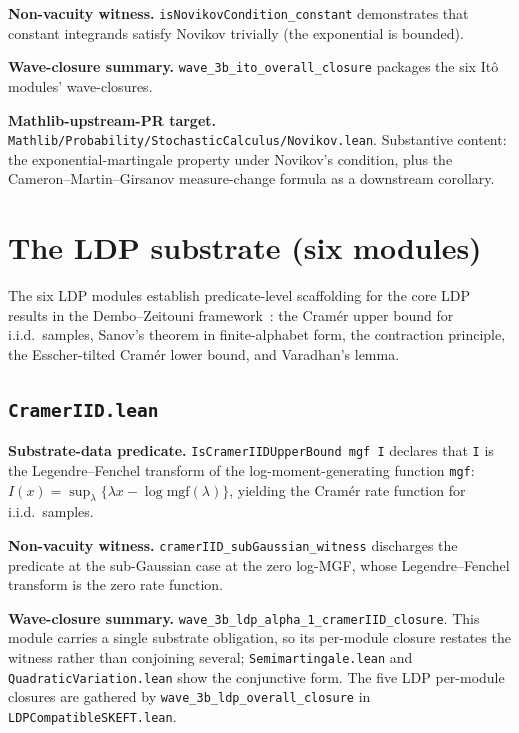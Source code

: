 \documentclass[11pt]{article}
\begin{document}
\textbf{Non-vacuity witness.}
\texttt{isNovikovCondition\_constant} demonstrates that constant
integrands satisfy Novikov trivially (the exponential is bounded).

\textbf{Wave-closure summary.}
\texttt{wave\_3b\_ito\_overall\_closure} packages the six It\^o
modules' wave-closures.

\textbf{Mathlib-upstream-PR target.}
\texttt{Mathlib/Probability/StochasticCalculus/Novikov.lean}.
Substantive content: the exponential-martingale property under
Novikov's condition, plus the Cameron--Martin--Girsanov measure-change
formula as a downstream corollary.


\section{The LDP substrate (six modules)}
\label{sec:ldp}

The six LDP modules establish predicate-level scaffolding for the
core LDP results in the Dembo--Zeitouni
framework~\cite{DemboZeitouni1998LDT}: the Cram\'er upper bound for
i.i.d.\ samples, Sanov's theorem in finite-alphabet form, the
contraction principle, the Esscher-tilted Cram\'er lower bound,
and Varadhan's lemma.

\subsection{\texttt{CramerIID.lean}}

\textbf{Substrate-data predicate.}
\texttt{IsCramerIIDUpperBound mgf I} declares that \texttt{I} is the
Legendre--Fenchel transform of the log-moment-generating function
\texttt{mgf}: $I(x) = \sup_\lambda \{\lambda x - \log \mathrm{mgf}(\lambda)\}$,
yielding the Cram\'er rate function for i.i.d.\ samples.

\textbf{Non-vacuity witness.}
\texttt{cramerIID\_subGaussian\_witness} discharges the predicate at the sub-Gaussian case at the zero log-MGF, whose Legendre--Fenchel transform is the zero rate function.

\textbf{Wave-closure summary.}
\texttt{wave\_3b\_ldp\_alpha\_1\_cramerIID\_closure}. This module carries a single substrate obligation, so
its per-module closure restates the witness rather than conjoining
several; \texttt{Semimartingale.lean} and
\texttt{QuadraticVariation.lean} show the conjunctive form. The five
LDP per-module closures are gathered by
\texttt{wave\_3b\_ldp\_overall\_closure} in
\texttt{LDPCompatibleSKEFT.lean}.
\end{document}
